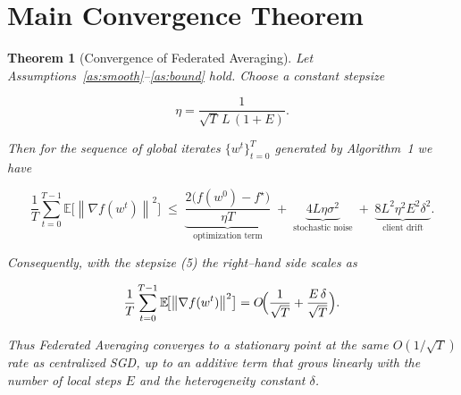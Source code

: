 \documentclass{article}
\newtheorem{theorem}{Theorem}
\newcommand{\E}{\mathbb{E}}
\newcommand{\norm}[1]{\left\|#1\right\|}
\begin{document}
\section*{Main Convergence Theorem}
\begin{theorem}[Convergence of Federated Averaging]\label{thm:main}
Let Assumptions~\ref{as:smooth}–\ref{as:bound} hold.
Choose a constant stepsize  

\[
\eta = \frac{1}{\sqrt{T}\,L\,(1+E)} .
\tag{5}
\]

Then for the sequence of global iterates $\{w^{t}\}_{t=0}^{T}$ generated by
Algorithm~1 we have  

\[
\frac{1}{T}\sum_{t=0}^{T-1}\E\!\bigl[\norm{\nabla f(w^{t})}^2\bigr]
\;\le\;
\underbrace{\frac{2\bigl(f(w^{0})-f^{\star}\bigr)}{\eta T}}_{\displaystyle\text{optimization term}}
\;+\;
\underbrace{4L\eta\sigma^2}_{\displaystyle\text{stochastic noise}}
\;+\;
\underbrace{8L^2\eta^2E^2\delta^2}_{\displaystyle\text{client drift}} .
\tag{6}
\]

Consequently, with the stepsize (5) the right–hand side scales as  

\[
\frac{1}{T}\sum_{t=0}^{T-1}\E\!\bigl[\norm{\nabla f(w^{t})}^2\bigr]
= O\!\Bigl(\frac{1}{\sqrt{T}} + \frac{E\,\delta}{\sqrt{T}}\Bigr) .
\]

Thus Federated Averaging converges to a stationary point at the
same $O(1/\sqrt{T})$ rate as centralized SGD, up to an additive term that
grows linearly with the number of local steps $E$ and the heterogeneity constant $\delta$.
\end{theorem}

\end{document}
